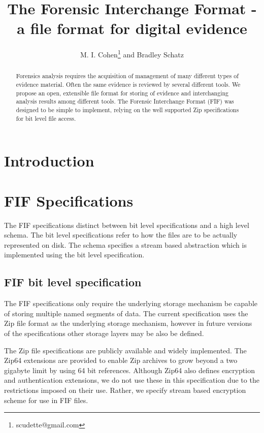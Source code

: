 \documentclass[12pt, conference]{IEEEtran}
\begin{document}
\title{The Forensic Interchange Format - a file format for digital evidence}
\author{M. I. Cohen\footnote{scudette@gmail.com} and Bradley Schatz}
\maketitle

\begin{abstract}
Forensics analysis requires the acquisition of management of many
different types of evidence material. Often the same evidence is
reviewed by several different tools. We propose an open, extensible
file format for storing of evidence and interchanging analysis results
among different tools. The Forensic Interchange Format (FIF) was
designed to be simple to implement, relying on the well supported Zip
specifications for bit level file access.
\end{abstract}

\section{Introduction}

\section{FIF Specifications}
The FIF specifications distinct between bit level specifications and
a high level schema. The bit level specifications refer to how the
files are to be actually represented on disk. The schema specifies a
stream based abstraction which is implemented using the bit level
specification. 

\subsection{FIF bit level specification}
The FIF specifications only require the underlying storage mechanism
be capable of storing multiple named segments of data. The current
specification uses the Zip file format as the underlying storage
mechanism, however in future versions of the specifications other
storage layers may be also be defined.

The Zip file specifications are publicly available and widely
implemented. The Zip64 extensions are provided to enable Zip archives
to grow beyond a two gigabyte limit by using 64 bit
references. Although Zip64 also defines encryption and authentication
extensions, we do not use these in this specification due to the
restrictions imposed on their use. Rather, we specify stream based
encryption scheme for use in FIF files.
\end{document}
